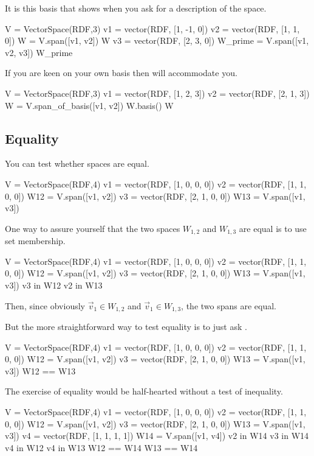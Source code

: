 It is this basis that \Sage{} shows when you ask for a description
of the space.
\begin{sageoutput}[d,0,3]
V = VectorSpace(RDF,3)               
v1 = vector(RDF, [1, -1, 0]) 
v2 = vector(RDF, [1, 1, 0]) 
W = V.span([v1, v2])       
W
v3 = vector(RDF, [2, 3, 0])
W_prime = V.span([v1, v2, v3])
W_prime
\end{sageoutput}

If you are keen on your own basis then \Sage{} will
accommodate you.
\begin{sageoutput}
V = VectorSpace(RDF,3)
v1 = vector(RDF, [1, 2, 3])
v2 = vector(RDF, [2, 1, 3])
W = V.span_of_basis([v1, v2])
W.basis()
W
\end{sageoutput}




\subsection{Equality}

You can test whether spaces are equal.
\begin{sageoutput}
V = VectorSpace(RDF,4)
v1 = vector(RDF, [1, 0, 0, 0])
v2 = vector(RDF, [1, 1, 0, 0])
W12 = V.span([v1, v2])
v3 = vector(RDF, [2, 1, 0, 0])
W13 = V.span([v1, v3])  
\end{sageoutput}
\noindent
One way to assure yourself that the two spaces $W_{1,2}$ and $W_{1,3}$ 
are equal is to use set membership.
\begin{sageoutput}[d,0,6]
V = VectorSpace(RDF,4)
v1 = vector(RDF, [1, 0, 0, 0])
v2 = vector(RDF, [1, 1, 0, 0])
W12 = V.span([v1, v2])
v3 = vector(RDF, [2, 1, 0, 0])
W13 = V.span([v1, v3])  
v3 in W12
v2 in W13
\end{sageoutput}
\noindent
Then, since obviously $\vec{v}_1\in W_{1,2}$ and $\vec{v}_1\in W_{1,3}$, the two
spans are equal.

But the more straightforward way to test equality is to just ask \Sage{}.
\begin{sageoutput}[d,0,6]
V = VectorSpace(RDF,4)
v1 = vector(RDF, [1, 0, 0, 0])
v2 = vector(RDF, [1, 1, 0, 0])
W12 = V.span([v1, v2])
v3 = vector(RDF, [2, 1, 0, 0])
W13 = V.span([v1, v3])  
W12 == W13
\end{sageoutput}
\noindent
The exercise of \inlinecode{==} equality 
would be half-hearted without a test of inequality. 
\begin{sageoutput}[d,0,6]
V = VectorSpace(RDF,4)
v1 = vector(RDF, [1, 0, 0, 0])
v2 = vector(RDF, [1, 1, 0, 0])
W12 = V.span([v1, v2])
v3 = vector(RDF, [2, 1, 0, 0])
W13 = V.span([v1, v3])  
v4 = vector(RDF, [1, 1, 1, 1])
W14 = V.span([v1, v4])
v2 in W14
v3 in W14                                 
v4 in W12
v4 in W13
W12 == W14                                                              
W13 == W14
\end{sageoutput}

